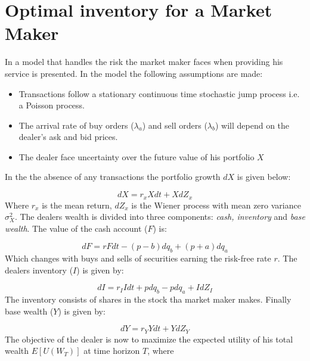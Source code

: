 \documentclass{kththesis}
\theoremstyle{definition}
\begin{document}
\section{Optimal inventory for a Market Maker}
In \textcite{ho1981optimal} a model that handles the risk the market maker faces when providing his service is presented. In the model the following assumptions are made:

\begin{itemize}
    \item Transactions follow a stationary continuous time stochastic jump process i.e. a Poisson process. 
    
    \item The arrival rate of buy orders ($\lambda_a$) and sell orders ($\lambda_b$) will depend on the dealer's ask and bid prices.
    
    \item The dealer face uncertainty over the future value of his portfolio $X$
\end{itemize}
In the the absence of any transactions the portfolio growth $dX$ is given below:

\begin{equation}
    \label{eq:a8}
    dX = r_{x}Xdt + XdZ_x
\end{equation}
Where $r_x$ is the mean return, $dZ_x$ is the Wiener process with mean zero variance $\sigma^{2}_X$. The dealers wealth is divided into three components: \textit{cash, inventory} and \textit{base wealth}. The value of the cash account ($F$) is:

\begin{equation}
    \label{eq:a9}
    dF = rFdt- (p-b)dq_b + (p+a)dq_a
\end{equation}
Which changes with buys and sells of securities earning the risk-free rate $r$. The dealers inventory ($I$) is given by:

\begin{equation}
    \label{eq:a10}
    dI = r_{I}Idt+pdq_{b} - pdq_{a} + IdZ_{I}
\end{equation}
The inventory consists of shares in the stock tha market maker makes.
Finally base wealth ($Y$) is given by:

\begin{equation}
    \label{eq:a11}
    dY = r_{Y}Ydt+YdZ_{Y} 
\end{equation}
The objective of the dealer is now to maximize the expected utility of his total wealth $E[U(W_T)]$ at time horizon $T$, where 
\end{document}
